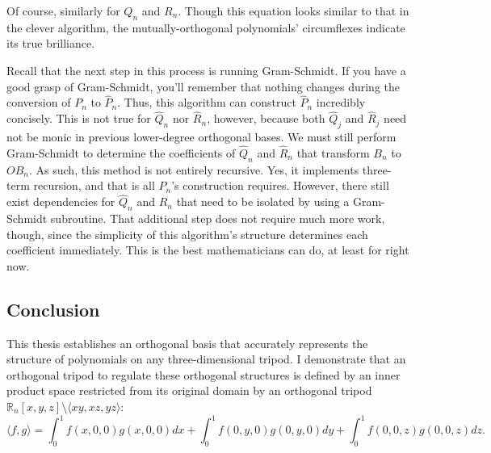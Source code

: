 \documentclass[letterpaper, 12pt]{article}
\begin{document}
\noindent Of course, similarly for $Q_n$ and $R_n$. Though this equation looks similar to that in the clever algorithm, the mutually-orthogonal polynomials' circumflexes indicate its true brilliance.

Recall that the next step in this process is running Gram-Schmidt. If you have a good grasp of Gram-Schmidt, you'll remember that nothing changes during the conversion of $P_n$ to $\hat{P}_n$. Thus, this algorithm can construct $\hat{P}_n$ incredibly concisely. This is not true for $\hat{Q}_n$ nor $\hat{R}_n$, however, because both $\hat{Q}_j$ and $\hat{R}_j$ need not be monic in previous lower-degree orthogonal bases. We must still perform Gram-Schmidt to determine the coefficients of $\hat{Q}_n$ and $\hat{R}_n$ that transform $B_n$ to $OB_n$. As such, this method is not entirely recursive. Yes, it implements three-term recursion, and that is all $\hat{P}_n$'s construction requires. However, there still exist dependencies for $\hat{Q}_n$ and $\hat{R}_n$ that need to be isolated by using a Gram-Schmidt subroutine. That additional step does not require much more work, though, since the simplicity of this algorithm's structure determines each coefficient immediately. This is the best mathematicians can do, at least for right now.







\newpage
{}
\begin{centering}\section*{Conclusion}\end{centering}

This thesis establishes an orthogonal basis that accurately represents the structure of polynomials on any three-dimensional tripod. I demonstrate that an orthogonal tripod to regulate these orthogonal structures is defined by an inner product space restricted from its original domain by an orthogonal tripod $\mathbb{R}_n [x, y, z] \setminus \langle xy, xz, yz \rangle$:
$$\langle f, g\rangle = \int_0^1 f(x,0,0)g(x,0,0) dx + \int_0^1 f(0,y,0)g(0,y,0) dy + \int_0^1 f(0,0,z)g(0,0,z) dz.$$
\end{document}
